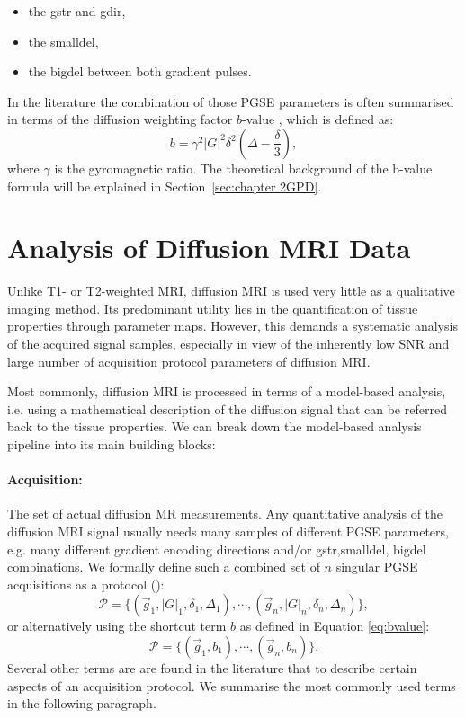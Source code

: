\begin{itemize}
	\item the {\gls{gstr}} and {\gls{gdir}},
	\item the {\gls{smalldel}},
	\item the {\gls{bigdel}} between both gradient pulses.
\end{itemize}

In the literature the combination of those PGSE parameters is often summarised in terms of the diffusion weighting factor $b$-value \citep{LeBihan:1986}, which is defined as:
\begin{equation}
	b = \gamma^2|G|^2\delta^2(\Delta-\frac{\delta}{3}),
    \label{eq:bvalue}
\end{equation}
where $\gamma$ is the gyromagnetic ratio. The theoretical background of the b-value formula will be explained in Section~\ref{sec:chapter 2GPD}.

\section{Analysis of Diffusion MRI Data}
Unlike T1- or T2-weighted MRI, diffusion MRI is used very little as a qualitative imaging method. Its predominant utility lies in the quantification of tissue properties through parameter maps. However, this demands a systematic analysis of the acquired signal samples, especially in view of the inherently low SNR and large number of acquisition protocol parameters of diffusion MRI.


Most commonly, diffusion MRI is processed in terms of a model-based analysis, i.e. using a mathematical description of the diffusion signal that can be referred back to the tissue properties. We can break down the model-based analysis pipeline into its main building blocks: 
\paragraph{Acquisition:} The set of actual diffusion MR measurements. Any quantitative analysis of the diffusion MRI signal usually needs many samples of different PGSE parameters, e.g. many different gradient encoding directions and/or \gls{gstr},\gls{smalldel}, \gls{bigdel} combinations. We formally define such a combined set of $n$ singular PGSE acquisitions as a protocol (\prot):
\begin{equation}
	\mathcal{P} = \{(\vec{g}_1,|G|_1,\delta_1,\Delta_1),\cdots,(\vec{g}_n,|G|_n,\delta_n,\Delta_n)\},
\end{equation}
or alternatively using the shortcut term $b$ as defined in Equation \ref{eq:bvalue}:
\begin{equation*}		
	\mathcal{P} = \{(\vec{g}_1,b_1),\cdots,(\vec{g}_n,b_n)\}.
\end{equation*}
Several other terms are are found in the literature that to describe certain aspects of an acquisition protocol. We summarise the most commonly used terms in the following paragraph. 


